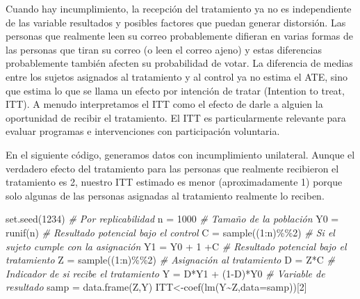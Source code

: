 \documentclass[
]{article}
\newenvironment{Shaded}{\begin{snugshade}}{\end{snugshade}}
\newcommand{\AttributeTok}[1]{\textcolor[rgb]{0.77,0.63,0.00}{#1}}
\newcommand{\CommentTok}[1]{\textcolor[rgb]{0.56,0.35,0.01}{\textit{#1}}}
\newcommand{\DecValTok}[1]{\textcolor[rgb]{0.00,0.00,0.81}{#1}}
\newcommand{\FunctionTok}[1]{\textcolor[rgb]{0.00,0.00,0.00}{#1}}
\newcommand{\NormalTok}[1]{#1}
\newcommand{\OtherTok}[1]{\textcolor[rgb]{0.56,0.35,0.01}{#1}}
\newcommand{\SpecialCharTok}[1]{\textcolor[rgb]{0.00,0.00,0.00}{#1}}
\begin{document}
Cuando hay incumplimiento, la recepción del tratamiento ya no es
independiente de las variable resultados y posibles factores que puedan
generar distorsión. Las personas que realmente leen su correo
probablemente difieran en varias formas de las personas que tiran su
correo (o leen el correo ajeno) y estas diferencias probablemente
también afecten su probabilidad de votar. La diferencia de medias entre
los sujetos asignados al tratamiento y al control ya no estima el ATE,
sino que estima lo que se llama un efecto por intención de tratar
(Intention to treat, ITT). A menudo interpretamos el ITT como el efecto
de darle a alguien la oportunidad de recibir el tratamiento. El ITT es
particularmente relevante para evaluar programas e intervenciones con
participación voluntaria.

En el siguiente código, generamos datos con incumplimiento unilateral.
Aunque el verdadero efecto del tratamiento para las personas que
realmente recibieron el tratamiento es 2, nuestro ITT estimado es menor
(aproximadamente 1) porque solo algunas de las personas asignadas al
tratamiento realmente lo reciben.

\begin{Shaded}
\begin{Highlighting}[]
\FunctionTok{set.seed}\NormalTok{(}\DecValTok{1234}\NormalTok{) }\CommentTok{\# Por replicabilidad}
\NormalTok{n }\OtherTok{=} \DecValTok{1000} \CommentTok{\# Tamaño de la población}
\NormalTok{Y0 }\OtherTok{=} \FunctionTok{runif}\NormalTok{(n) }\CommentTok{\# Resultado potencial bajo el control}
\NormalTok{C }\OtherTok{=} \FunctionTok{sample}\NormalTok{((}\DecValTok{1}\SpecialCharTok{:}\NormalTok{n)}\SpecialCharTok{\%\%}\DecValTok{2}\NormalTok{) }\CommentTok{\# Si el sujeto cumple con la asignación}
\NormalTok{Y1 }\OtherTok{=}\NormalTok{ Y0 }\SpecialCharTok{+} \DecValTok{1} \SpecialCharTok{+}\NormalTok{C }\CommentTok{\# Resultado potencial bajo el tratamiento }
\NormalTok{Z }\OtherTok{=} \FunctionTok{sample}\NormalTok{((}\DecValTok{1}\SpecialCharTok{:}\NormalTok{n)}\SpecialCharTok{\%\%}\DecValTok{2}\NormalTok{) }\CommentTok{\# Asignación al tratamiento}
\NormalTok{D }\OtherTok{=}\NormalTok{ Z}\SpecialCharTok{*}\NormalTok{C }\CommentTok{\# Indicador de si recibe el tratamiento}
\NormalTok{Y }\OtherTok{=}\NormalTok{ D}\SpecialCharTok{*}\NormalTok{Y1 }\SpecialCharTok{+}\NormalTok{ (}\DecValTok{1}\SpecialCharTok{{-}}\NormalTok{D)}\SpecialCharTok{*}\NormalTok{Y0 }\CommentTok{\# Variable de resultado}
\NormalTok{samp }\OtherTok{=} \FunctionTok{data.frame}\NormalTok{(Z,Y)}
\NormalTok{ITT}\OtherTok{\textless{}{-}}\FunctionTok{coef}\NormalTok{(}\FunctionTok{lm}\NormalTok{(Y}\SpecialCharTok{\textasciitilde{}}\NormalTok{Z,}\AttributeTok{data=}\NormalTok{samp))[}\DecValTok{2}\NormalTok{]}
\end{Highlighting}
\end{Shaded}
\end{document}
